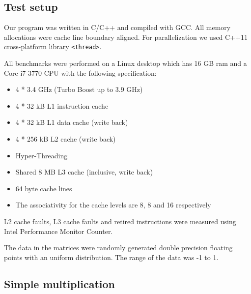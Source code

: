 \subsection{Test setup}

Our program was written in C/C++ and compiled with GCC. All memory allocations were cache line boundary aligned. For parallelization we used C++11 cross-platform library \texttt{<thread>}.

All benchmarks were performed on a Linux desktop which has 16 GB ram and a Core i7 3770 CPU with the following specification:

\begin{itemize}
\item 4 * 3.4 GHz (Turbo Boost up to 3.9 GHz)
\item 4 * 32 kB L1 instruction cache
\item 4 * 32 kB L1 data cache (write back)
\item 4 * 256 kB L2 cache (write back)
\item Hyper-Threading
\item Shared 8 MB L3 cache (inclusive, write back)
\item 64 byte cache lines
\item The associativity for the cache levels are 8, 8 and 16 respectively
\end{itemize}

L2 cache faults, L3 cache faults and retired instructions were measured using Intel Performance Monitor Counter.

The data in the matrices were randomly generated double precision floating points with
an uniform distribution. The range of the data was -1 to
1.

\subsection{Simple multiplication}

